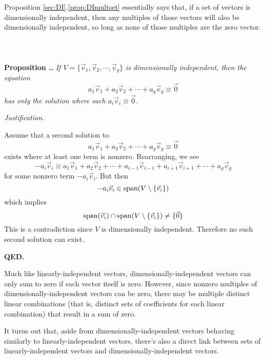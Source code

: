 \documentclass[a4paper, 12pt, reqno]{amsart}
\newcommand\vecspan[1]{\textup{span}(#1)}
\newcounter{propcounter}[section]
\newenvironment{proposition}[1]
{
	\refstepcounter{propcounter}
	\textbf{Proposition \thesection.\thepropcounter.} \emph{#1}
	
	\emph{Justification.}
}
{
	\textbf{QED.} \\
}
\begin{document}
		Proposition \ref{sec:DI}.\ref{prop:DImultset} essentially says that, if a set of vectors is dimensionally independent, then any multiples of those vectors will also 
		be dimensionally independent, so long as none of those multiples are the zero vector.
		\\ \\ \\ \\
		\begin{proposition}{If $V = \{\vec{v}_1, \vec{v}_2, \cdots, \vec{v}_g\}$ is dimensionally independent, then the equation
		\[
			a_1\vec{v}_1 + a_2\vec{v}_2 + \cdots + a_g\vec{v}_g \equiv \vec{0}
		\]
		has only the solution where each $a_i\vec{v}_i \equiv \vec{0}$.}
			\label{prop:DIzerosum}
			Assume that a second solution to
			\[
				a_1\vec{v}_1 + a_2\vec{v}_2 + \cdots + a_g\vec{v}_g \equiv \vec{0}
			\]
			exists where at least one term is nonzero. Rearranging, we see
			\[
				-a_i\vec{v}_i \equiv a_1\vec{v}_1 + a_2\vec{v}_2 + \cdots + a_{i-1}\vec{v}_{i-1} + a_{i+1}\vec{v}_{i+1} + \cdots + a_g\vec{v}_g
			\]
			for some nonzero term $-a_i\vec{v}_i$. But then
			\[
				-a_i\vec{v}_i \in \vecspan{V \setminus \{\vec{v}_i\}}
			\]
			which implies
			\[
				\vecspan{\vec{v}_i} \cap \vecspan{V \setminus \{\vec{v}_i\}} \neq \{\vec{0}\}
			\]
			This is a contradiction since $V$ is dimensionally independent. Therefore no such second solution can exist.
		\end{proposition}
		
		Much like linearly-independent vectors, dimensionally-independent vectors can only sum to zero if each vector itself is zero. However, since nonzero multiples of
		dimensionally-independent vectors can be zero, there may be multiple distinct linear combinations (that is, distinct sets of coefficients for each linear combination)
		that result in a sum of zero.
		
		It turns out that, aside from dimensionally-independent vectors behaving similarly to linearly-independent vectors, there's also a direct link between sets of 
		linearly-independent vectors and dimensionally-independent vectors.
\end{document}
